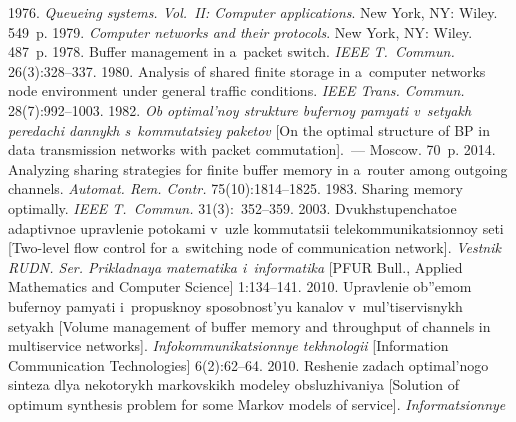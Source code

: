   \begin{multicols}{2}

\renewcommand{\bibname}{\protect\rmfamily References}

{\small\frenchspacing
 {%
 \begin{thebibliography}{99}

 1976. \textit{Queueing systems. Vol.~II: Computer applications}. 
New York, NY: Wiley. 549~p. 
 1979. 
\textit{Computer networks and their protocols}. New York, NY: Wiley. 487~p.
 1978. Buffer management in a~packet switch. 
\textit{IEEE T.~Commun.} 26(3):328--337.
 1980. Analysis of shared finite storage in 
a~computer networks node environment under general traffic conditions. \textit{IEEE 
Trans. Commun.} 28(7):992--1003.
 1982. \textit{Ob optimal'noy strukture bufernoy 
pamyati v~setyakh peredachi dannykh s~kommutatsiey paketov} [On the optimal 
structure of BP in data transmission networks with packet commutation].~--- 
Moscow. 70~p. 
 2014. Analyzing sharing strategies for finite buffer memory in 
a~router among outgoing channels. \textit{Automat. Rem. Contr.} 
75(10):1814--1825.
 1983. Sharing memory optimally. 
\textit{IEEE T.~Commun.} 31(3):~352--359.
 2003. Dvukhstupenchatoe adaptivnoe upravlenie potokami 
v~uzle kommutatsii te\-le\-kom\-mu\-ni\-ka\-tsi\-on\-noy seti [Two-level flow control for 
a~switching node of communication network]. \textit{Vestnik RUDN. Ser. Prikladnaya 
matematika i~informatika} [PFUR Bull., Applied Mathematics and Computer 
Science] 1:134--141.
 2010. Upravlenie ob''emom bufernoy pa\-mya\-ti i~propusknoy 
sposobnost'yu kanalov v~mul'tiservisnykh setyakh [Volume management of 
buffer memory and throughput of channels in multiservice networks]. 
\textit{Infokommunikatsionnye tekhnologii} [Information  
Communication Technologies] 6(2):62--64. 
 2010. Reshenie zadach optimal'nogo sinteza dlya 
nekotorykh markovskikh modeley obsluzhivaniya [Solution of optimum 
synthesis problem for some Markov models of service]. \textit{Informatsionnye 
}
\end{thebibliography}}}
\end{multicols}
